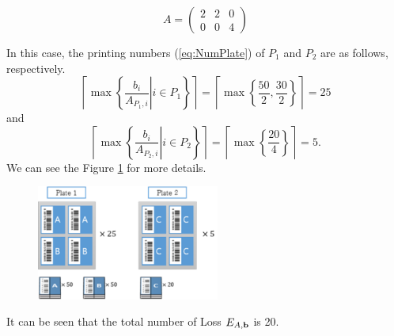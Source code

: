 \documentclass[review]{elsarticle}
\begin{document}
	\begin{equation}
	A = \left(\begin{array}{ccc}2 & 2 & 0 \\ 0 & 0 & 4 \end{array}\right)
	\end{equation}
	
	In this case, the printing numbers (\ref{eq:NumPlate}) of $P_1$ and $P_2$ are as follows, respectively.
	\begin{equation}
	\left\lceil \max\left\{ \left. \frac{b_{i}}{A_{P_{1},i}} \right| i \in P_{1} \right\} \right\rceil = \left\lceil \max \left\{ \frac{50}{2}, \frac{30}{2} \right\} \right\rceil = 25
	\end{equation}
	and
	\begin{equation}
	\left\lceil \max\left\{ \left. \frac{b_{i}}{A_{P_{2},i}} \right| i \in P_{2} \right\} \right\rceil = \left\lceil \max \left\{ \frac{20}{4} \right\} \right\rceil = 5.
	\end{equation}
	We can see the Figure \ref{fig:ex11} for more details.
	
	\begin{figure}[h!]
		\centering
		\includegraphics[width=6cm]{ex11.pdf}
		\caption{}
		\label{fig:ex11}       %
	\end{figure}
	
	It can be seen that the total number of Loss $E_{A,{\bf b}}$ is 20.
	
\end{document}

